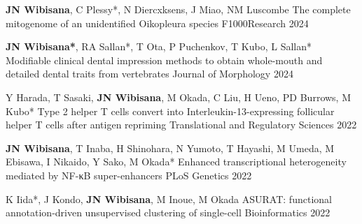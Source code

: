 



\begin{cventries}

  \cventrypub
    {\textbf{JN Wibisana}, C Plessy*, N Diercxksens, J Miao, NM Luscombe} %
    {The complete mitogenome of an unidentified Oikopleura species
    } %
    {F1000Research} %
    {2024} %

  \cventrypub
    {\textbf{JN Wibisana*}, RA Sallan*, T Ota, P Puchenkov, T Kubo, L Sallan*} %
    {Modifiable clinical dental impression methods to obtain whole-mouth and detailed dental traits from vertebrates} %
    {Journal of Morphology} %
    {2024} %

  \cventrypub
    {Y Harada, T Sasaki, \textbf{JN Wibisana}, M Okada, C Liu, H Ueno, PD Burrows, M Kubo*} %
    {Type 2 helper T cells convert into Interleukin-13-expressing follicular helper T cells after antigen repriming} %
    {Translational and Regulatory Sciences} %
    {2022} %


  \cventrypub
    {\textbf{JN Wibisana}, T Inaba, H Shinohara, N Yumoto, T Hayashi, M Umeda, M Ebisawa, I Nikaido, Y Sako, M Okada*} %
    {Enhanced transcriptional heterogeneity mediated by NF-κB super-enhancers} %
    {PLoS Genetics} %
    {2022} %

  \cventrypublast
    {K Iida*, J Kondo, \textbf{JN Wibisana}, M Inoue, M Okada} %
    {ASURAT: functional annotation-driven unsupervised clustering of single-cell} %
    {Bioinformatics} %
    {2022} %


\end{cventries}


